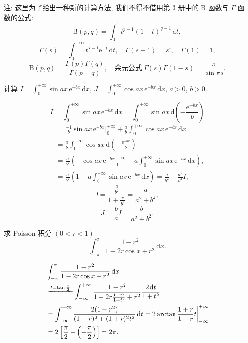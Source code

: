 注: 这里为了给出一种新的计算方法, 我们不得不借用第 3 册中的 B 函数与 $\Gamma$ 函数的公式:
\[
\mathrm{B}(p,q)=\int_{0}^{1}t^{p-1}(1-t)^{q-1}\,\mathrm{d}t,
\]
\[
\Gamma(s)=\int_{0}^{+\infty}t^{s-1}\mathrm{e}^{-t}\,\mathrm{d}t,\quad\Gamma(s+1)=s!,\quad\Gamma(1)=1,
\]
\[
\mathrm{B}(p,q)=\frac{\Gamma(p)\Gamma(q)}{\Gamma(p+q)},\quad\text{余元公式}\ \Gamma(s)\Gamma(1-s)=\frac{\pi}{\sin\pi s}.
\]

\begin{example}\label{ex:6.5.5}
计算 $I=\int_{0}^{+\infty}\sin ax\,\mathrm{e}^{-bx}\,\mathrm{d}x$, $J=\int_{0}^{+\infty}\cos ax\,\mathrm{e}^{-bx}\,\mathrm{d}x$, $a>0$, $b>0$.
\end{example}

\begin{solution}
\[
I=\int_{0}^{+\infty}\sin ax\,\mathrm{e}^{-bx}\,\mathrm{d}x=\int_{0}^{+\infty}\sin ax\,\mathrm{d}\left(-\frac{\mathrm{e}^{-bx}}{b}\right)
\]
\begin{align*}
&=\frac{-1}{b}\sin ax\,\mathrm{e}^{-bx}\bigg|_{0}^{+\infty}+\frac{a}{b}\int_{0}^{+\infty}\cos ax\,\mathrm{e}^{-bx}\,\mathrm{d}x\\
&=\frac{a}{b}\int_{0}^{+\infty}\cos ax\,\mathrm{d}\left(-\frac{\mathrm{e}^{-bx}}{b}\right)\\
&=\frac{a}{b^{2}}\left(-\cos ax\,\mathrm{e}^{-bx}\bigg|_{0}^{+\infty}-a\int_{0}^{+\infty}\sin ax\,\mathrm{e}^{-bx}\,\mathrm{d}x\right),\\
&=\frac{a}{b^{2}}\left(1-a\int_{0}^{+\infty}\sin ax\,\mathrm{e}^{-bx}\,\mathrm{d}x\right)=\frac{a}{b^{2}}-\frac{a^{2}}{b^{2}}I,
\end{align*}
\[
I=\frac{\frac{a}{b^{2}}}{1+\frac{a^{2}}{b^{2}}}=\frac{a}{a^{2}+b^{2}},
\]
\[
J=\frac{b}{a}I=\frac{b}{a^{2}+b^{2}}.
\]
\end{solution}

\begin{example}\label{ex:6.5.6}
求 Poisson 积分 $(0<r<1)$
\[
\int_{-\pi}^{\pi}\frac{1-r^{2}}{1-2r\cos x+r^{2}}\,\mathrm{d}x.
\]
\end{example}

\begin{solution}
\begin{align*}
&\int_{-\pi}^{\pi}\frac{1-r^{2}}{1-2r\cos x+r^{2}}\,\mathrm{d}x\\
&\xlongequal{t=\tan\frac{x}{2}}\int_{-\infty}^{+\infty}\frac{1-r^{2}}{1-2r\frac{1-t^{2}}{1+t^{2}}+r^{2}}\frac{2\,\mathrm{d}t}{1+t^{2}}\\
&=\int_{-\infty}^{+\infty}\frac{2(1-r^{2})}{(1-r)^{2}+(1+r)^{2}t^{2}}\,\mathrm{d}t=2\arctan\frac{1+r}{1-r}t\bigg|_{-\infty}^{+\infty}\\
&=2\left[\frac{\pi}{2}-\left(-\frac{\pi}{2}\right)\right]=2\pi.
\end{align*}
\end{solution}

